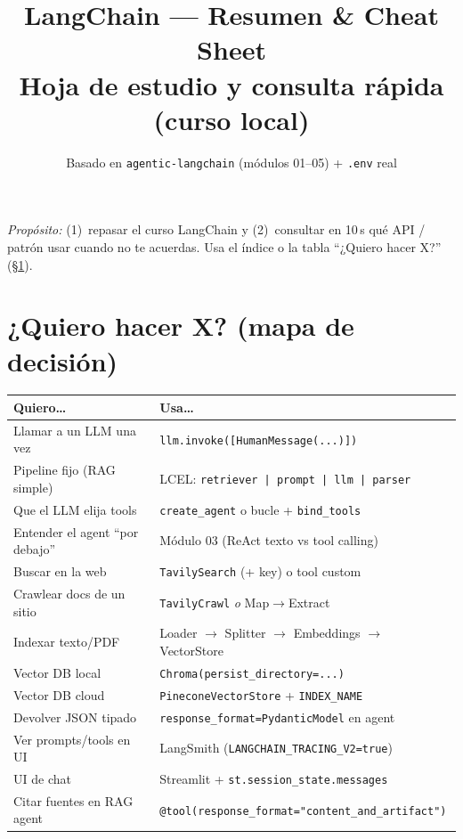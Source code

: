 \documentclass[11pt,a4paper]{article}
\title{%
  \textbf{LangChain --- Resumen \& Cheat Sheet}\\[0.35em]
  \large Hoja de estudio y consulta rápida (curso local)
}
\author{Basado en \texttt{agentic-langchain} (módulos 01--05) + \texttt{.env} real}
\date{}
\begin{document}
\maketitle
\tableofcontents
\vspace{0.8em}

\noindent\textit{Propósito:} (1)~repasar el curso LangChain y (2)~consultar en 10\,s qué API / patrón usar cuando no te acuerdas.
Usa el índice o la tabla ``¿Quiero hacer X?'' (\S\ref{sec:decision}).

\section{¿Quiero hacer X? (mapa de decisión)}
\label{sec:decision}

\begin{center}
\begin{tabular}{@{}p{6.8cm}p{8.5cm}@{}}
\toprule
\textbf{Quiero\ldots} & \textbf{Usa\ldots} \\
\midrule
Llamar a un LLM una vez & \texttt{llm.invoke([HumanMessage(...)])} \\
Pipeline fijo (RAG simple) & LCEL: \texttt{retriever | prompt | llm | parser} \\
Que el LLM elija tools & \texttt{create\_agent} o bucle + \texttt{bind\_tools} \\
Entender el agent ``por debajo'' & Módulo 03 (ReAct texto vs tool calling) \\
Buscar en la web & \texttt{TavilySearch} (+ key) o tool custom \\
Crawlear docs de un sitio & \texttt{TavilyCrawl} \emph{o} Map$\to$Extract \\
Indexar texto/PDF & Loader $\to$ Splitter $\to$ Embeddings $\to$ VectorStore \\
Vector DB local & \texttt{Chroma(persist\_directory=...)} \\
Vector DB cloud & \texttt{PineconeVectorStore} + \texttt{INDEX\_NAME} \\
Devolver JSON tipado & \texttt{response\_format=PydanticModel} en agent \\
Ver prompts/tools en UI & LangSmith (\texttt{LANGCHAIN\_TRACING\_V2=true}) \\
UI de chat & Streamlit + \texttt{st.session\_state.messages} \\
Citar fuentes en RAG agent & \texttt{@tool(response\_format="content\_and\_artifact")} \\
\bottomrule
\end{tabular}
\end{center}
\end{document}
